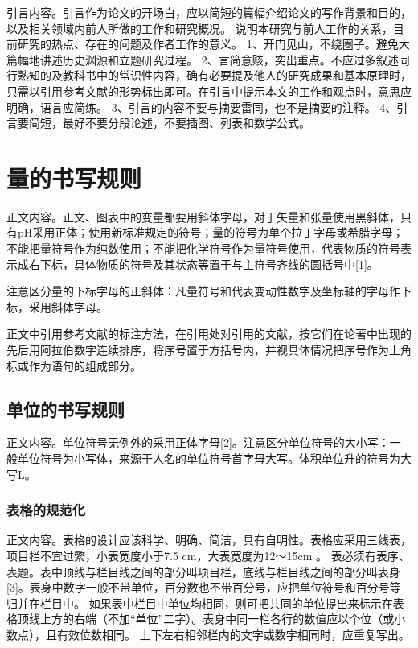 \documentclass[a4paper, zihao=5, UTF8, AutoFakeBold, AutoFakeSlant]{ctexart}
\begin{document}
\setlength{\parindent}{2em}

引言内容。引言作为论文的开场白，应以简短的篇幅介绍论文的写作背景和目的，以及相关领域内前人所做的工作和研究概况。
说明本研究与前人工作的关系，目前研究的热点、存在的问题及作者工作的意义。
1、开门见山，不绕圈子。避免大篇幅地讲述历史渊源和立题研究过程。
2、言简意赅，突出重点。不应过多叙述同行熟知的及教科书中的常识性内容，确有必要提及他人的研究成果和基本原理时，只需以引用参考文献的形势标出即可。在引言中提示本文的工作和观点时，意思应明确，语言应简练。
3、引言的内容不要与摘要雷同，也不是摘要的注释。
4、引言要简短，最好不要分段论述，不要插图、列表和数学公式。 

\section{量的书写规则}
正文内容。正文、图表中的变量都要用斜体字母，对于矢量和张量使用黑斜体，只有pH采用正体；使用新标准规定的符号；量的符号为单个拉丁字母或希腊字母；
不能把量符号作为纯数使用；不能把化学符号作为量符号使用，代表物质的符号表示成右下标，具体物质的符号及其状态等置于与主符号齐线的圆括号中[1]。\par
注意区分量的下标字母的正斜体：凡量符号和代表变动性数字及坐标轴的字母作下标，采用斜体字母。\par
正文中引用参考文献的标注方法，在引用处对引用的文献，按它们在论著中出现的先后用阿拉伯数字连续排序，将序号置于方括号内，并视具体情况把序号作为上角标或作为语句的组成部分。\par

\subsection{单位的书写规则}
正文内容。单位符号无例外的采用正体字母[2]。注意区分单位符号的大小写：一般单位符号为小写体，来源于人名的单位符号首字母大写。体积单位升的符号为大写L。\par

\subsubsection{表格的规范化}
正文内容。表格的设计应该科学、明确、简洁，具有自明性。表格应采用三线表，项目栏不宜过繁，小表宽度小于7.5 cm，大表宽度为12～15cm 。
表必须有表序、表题。表中顶线与栏目线之间的部分叫项目栏，底线与栏目线之间的部分叫表身[3]。表身中数字一般不带单位，百分数也不带百分号，应把单位符号和百分号等归并在栏目中。
如果表中栏目中单位均相同，则可把共同的单位提出来标示在表格顶线上方的右端（不加“单位”二字）。表身中同一栏各行的数值应以个位（或小数点），且有效位数相同。
上下左右相邻栏内的文字或数字相同时，应重复写出。
\end{document}
